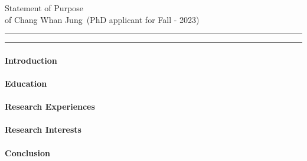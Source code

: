 \documentclass{article}
\newcommand{\soptitle}{Statement of Purpose}
\newcommand{\yourname}{Chang Whan Jung}
\begin{document}
\begin{center}\LARGE\soptitle\\
\large of \yourname\ (PhD applicant for Fall - 2023)
\end{center}

\hrule
\vspace{1pt}
\hrule height 1pt

\bigskip

\paragraph{Introduction}



\paragraph{Education}


\paragraph{Research Experiences}


\paragraph{Research Interests}


\paragraph{Conclusion}

%


\end{document}
